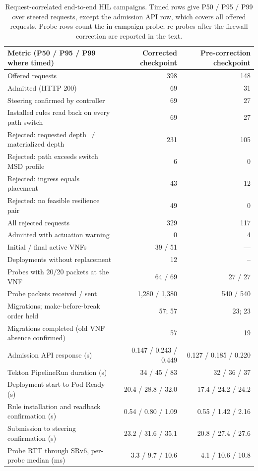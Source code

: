 \documentclass[final,5p]{elsarticle}
\newcommand{\rev}[1]{\textcolor{revisiongreen}{#1}}
\let\newrev\rev
\begin{document}
\begin{table}[t]
\centering
\caption{\newrev{Request-correlated end-to-end HIL campaigns. Timed rows give P50 / P95 / P99 over steered requests, except the admission API row, which covers all offered requests. Probe rows count the in-campaign probe; re-probes after the firewall correction are reported in the text.}}
\label{tab:hil_e2e_detailed}
{\color{revisiongreen}
\small
\begin{tabular}{@{}lrr@{}}
\toprule
Metric (P50 / P95 / P99 where timed) & Corrected checkpoint & Pre-correction checkpoint \\
\midrule
Offered requests & 398 & 148 \\
Admitted (HTTP 200) & 69 & 31 \\
Steering confirmed by controller & 69 & 27 \\
Installed rules read back on every path switch & 69 & 27 \\
Rejected: requested depth $\neq$ materialized depth & 231 & 105 \\
Rejected: path exceeds switch MSD profile & 6 & 0 \\
\newrev{Rejected: ingress equals placement} & \newrev{43} & \newrev{12} \\
\newrev{Rejected: no feasible resilience pair} & \newrev{49} & \newrev{0} \\
\newrev{All rejected requests} & \newrev{329} & \newrev{117} \\
\newrev{Admitted with actuation warning} & \newrev{0} & \newrev{4} \\
\newrev{Initial / final active VNFs} & \newrev{39 / 51} & \newrev{---} \\
\newrev{Deployments without replacement} & \newrev{12} & \newrev{--} \\
Probes with 20/20 packets at the VNF & 64 / 69 & 27 / 27 \\
Probe packets received / sent & 1,280 / 1,380 & 540 / 540 \\
Migrations; make-before-break order held & 57; 57 & 23; 23 \\
Migrations completed (old VNF absence confirmed) & 57 & 19 \\
Admission API response (s) & 0.147 / 0.243 / 0.449 & 0.127 / 0.185 / 0.220 \\
Tekton PipelineRun duration (s) & 34 / 45 / 83 & 32 / 36 / 37 \\
Deployment start to Pod Ready (s) & 20.4 / 28.8 / 32.0 & 17.4 / 24.2 / 24.2 \\
Rule installation and readback confirmation (s) & 0.54 / 0.80 / 1.09 & 0.55 / 1.42 / 2.16 \\
Submission to steering confirmation (s) & 23.2 / 31.6 / 35.1 & 20.8 / 27.4 / 27.6 \\
Probe RTT through SRv6, per-probe median (ms) & 3.3 / 9.7 / 10.6 & 4.1 / 10.6 / 10.8 \\
\bottomrule
\end{tabular}

}
\end{table}
\end{document}
